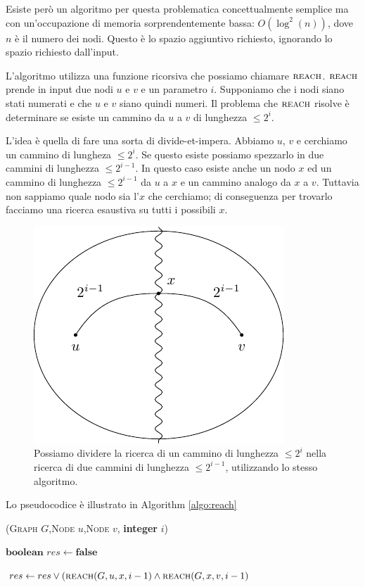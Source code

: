 Esiste però un algoritmo per questa problematica concettualmente semplice ma con un'occupazione di
memoria sorprendentemente bassa: $O(\log^{2}(n))$, dove $n$ è il numero dei nodi. Questo è lo
spazio aggiuntivo richiesto, ignorando lo spazio richiesto dall'input.

L'algoritmo utilizza una funzione ricorsiva che possiamo chiamare $\textsc{reach}$. $\textsc{reach}$ prende in input
due nodi $u$ e $v$ e un parametro $i$. Supponiamo che i nodi siano stati numerati e che $u$ e $v$
siano quindi numeri. Il problema che $\textsc{reach}$ risolve è determinare se esiste un cammino da $u$ a
$v$ di lunghezza $\leq 2^{i}$.

L'idea è quella di fare una sorta di divide-et-impera. Abbiamo $u$, $v$ e cerchiamo un cammino di
lungheza $\leq 2^{i}$. Se questo esiste possiamo spezzarlo in due cammini di lunghezza $\leq
2^{i-1}$. In questo caso esiste anche un nodo $x$ ed un cammino di lunghezza $\leq 2^{i-1}$ da $u$ a
$x$ e un cammino analogo da $x$ a $v$. Tuttavia non sappiamo quale nodo sia l'$x$ che cerchiamo; di
conseguenza per trovarlo facciamo una ricerca esaustiva su tutti i possibili $x$.

\begin{figure}[h]
    \begin{center}
        \includegraphics{./img/nondeterminism/SavitchAlgorithm.pdf}
        \caption{Possiamo dividere la ricerca di un cammino di lunghezza $\leq 2^{i}$ nella ricerca
        di due cammini di lunghezza $\leq 2^{i-1}$, utilizzando lo stesso algoritmo.}
    \end{center}
\end{figure}

Lo pseudocodice è illustrato in Algorithm \ref{algo:reach}

\begin{algorithm}
    \caption{\REACH(\textsc{Graph} $G$,\textsc{Node} $u$,\textsc{Node} $v$, \textbf{integer} $i$)}
    \label{algo:reach}
    {
    }
    \Else
    {
        $\textbf{boolean } res \gets \textbf{false}$

        {
            $res \gets res \lor (\textsc{reach}(G,u,x,i-1) \land \textsc{reach}(G,x,v,i-1)$
        }

    }
\end{algorithm}


